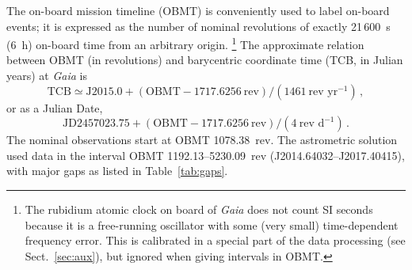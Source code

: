 \documentclass[longauth]{aa} %
\begin{document}
The on-board mission timeline (OBMT) is conveniently used to label on-board events; it is
expressed as the number of nominal revolutions of exactly 21\,600~s (6~h) on-board time from 
an arbitrary origin.%
\footnote{The rubidium atomic clock on board of \textit{Gaia} does not count SI seconds because 
it is a free-running oscillator with some (very small) time-dependent frequency error. This is 
calibrated in a special part of the data processing (see Sect.~\ref{sec:aux}), but ignored when giving 
intervals in OBMT.}
The approximate relation between OBMT (in revolutions) and barycentric
coordinate time (TCB, in Julian years) at \textit{Gaia} is
\begin{equation}\label{eq:obmt}
\text{TCB} \simeq \text{J}2015.0 + (\text{OBMT} - 1717.6256~\text{rev})/(1461~\text{rev~yr}^{-1}) \, ,
\end{equation} 
or as a Julian Date,
\begin{equation}\label{eq:obmtJD}
\text{JD}2457023.75 + (\text{OBMT} - 1717.6256~\text{rev})/(4~\text{rev~d}^{-1}) \, .
\end{equation} 
The nominal observations start at OBMT 1078.38~rev. The astrometric solution used
data in the interval OBMT 1192.13--5230.09~rev (J2014.64032--J2017.40415), with 
major gaps as listed in Table~\ref{tab:gaps}.
\end{document}
